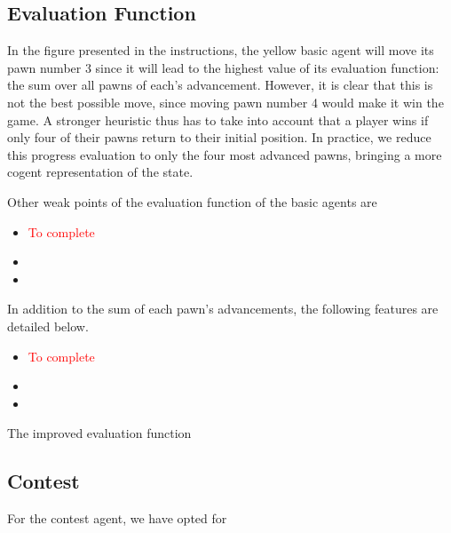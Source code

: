 \documentclass[journal,onecolumn]{IEEEtran}
\begin{document}
\subsection{Evaluation Function}
In the figure presented in the instructions, the yellow basic agent will move its pawn number 3 since it will lead to the highest value of its evaluation function: the sum over all pawns of each's advancement.
However, it is clear that this is not the best possible move, since moving pawn number 4 would make it win the game.
A stronger heuristic thus has to take into account that a player wins if only four of their pawns return to their initial position.
In practice, we reduce this progress evaluation to only the four most advanced pawns, bringing a more cogent representation of the state.

Other weak points of the evaluation function of the basic agents are
\begin{itemize}
	\item \textcolor{red}{To complete}
	\item 
	\item 
\end{itemize}
In addition to the sum of each pawn’s advancements, the following features are detailed below.

\begin{itemize}
 \item \textcolor{red}{To complete}
 \item 
 \item 
\end{itemize}

The improved evaluation function

\subsection{Contest}
For the contest agent, we have opted for 



\end{document}
